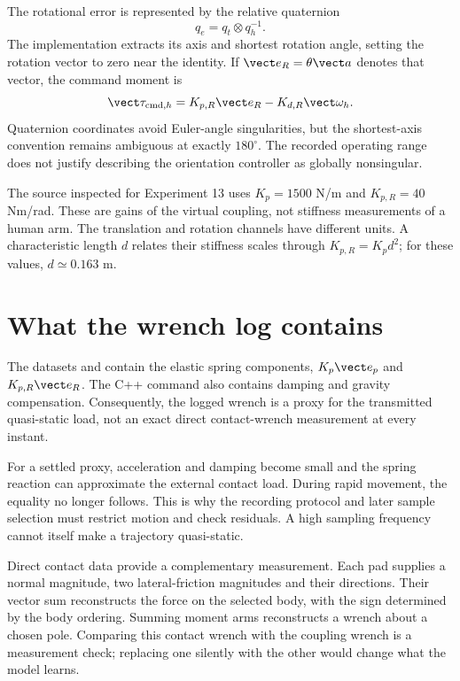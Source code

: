 The rotational error is represented by the relative quaternion
\begin{equation}
q_e=q_t\otimes q_h^{-1}.
\end{equation}
The implementation extracts its axis and shortest rotation angle, setting the rotation vector to zero near the identity. If $\vect e_R=\theta\vect a$ denotes that vector, the command moment is
\begin{equation}
\vect \tau_{\mathrm{cmd},h}=K_{p,R}\vect e_R-K_{d,R}\vect\omega_h.
\label{eq:rotation-coupling}
\end{equation}
Quaternion coordinates avoid Euler-angle singularities, but the shortest-axis convention remains ambiguous at exactly $180^\circ$. The recorded operating range does not justify describing the orientation controller as globally nonsingular.

The source inspected for Experiment 13 uses $K_p=1500$ N/m and $K_{p,R}=40$ Nm/rad. These are gains of the virtual coupling, not stiffness measurements of a human arm. The translation and rotation channels have different units. A characteristic length $d$ relates their stiffness scales through $K_{p,R}=K_p d^2$; for these values, $d\simeq0.163$ m.

\section{What the wrench log contains}

The datasets  and  contain the elastic spring components, $K_p\vect e_p$ and $K_{p,R}\vect e_R$. The C++ command also contains damping and gravity compensation. Consequently, the logged wrench is a proxy for the transmitted quasi-static load, not an exact direct contact-wrench measurement at every instant.

For a settled proxy, acceleration and damping become small and the spring reaction can approximate the external contact load. During rapid movement, the equality no longer follows. This is why the recording protocol and later sample selection must restrict motion and check residuals. A high sampling frequency cannot itself make a trajectory quasi-static.

Direct contact data provide a complementary measurement. Each pad supplies a normal magnitude, two lateral-friction magnitudes and their directions. Their vector sum reconstructs the force on the selected body, with the sign determined by the body ordering. Summing moment arms reconstructs a wrench about a chosen pole. Comparing this contact wrench with the coupling wrench is a measurement check; replacing one silently with the other would change what the model learns.

